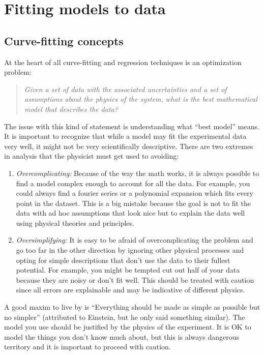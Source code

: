 

\chapter{Fitting models to data}

\section{Curve-fitting concepts}

At the heart of all curve-fitting and regression techniques is an optimization problem:
\begin{quote}
\emph{Given a set of data with the associated uncertainties and a set of assumptions about the physics of the system, what is the best mathematical model that describes the data?}
\end{quote}
The issue with this kind of statement is understanding what ``best model'' means. It is important to recognize that while a model may fit the experimental data very well, it might not be very scientifically descriptive. There are two extremes in analysis that the physicist must get used to avoiding:
\begin{enumerate}
\item {\it Overcomplicating:} Because of the way the math works, it is always possible to find a model complex enough to account for all the data. For example, you could always find a fourier series or a polynomial expansion which fits every point in the dataset. This is a big mistake because the goal is not to fit the data with ad hoc assumptions that look nice but to explain the data well using physical theories and principles.
\item {\it Oversimplifying:} It is easy to be afraid of overcomplicating the problem and go too far in the other direction by ignoring other physical processes and opting for simple descriptions that don't use the data to their fullest potential. For example, you might be tempted cut out half of your data because they are noisy or don't fit well. This should be treated with caution since all errors are explainable and may be indicative of different physics.
\end{enumerate}
A good maxim to live by is ``Everything should be made as simple as possible but no simpler'' (attributed to Einstein, but he only said something similar). The model you use should be justified by the physics of the experiment. It is OK to model the things you don't know much about, but this is always dangerous territory and it is important to proceed with caution.

